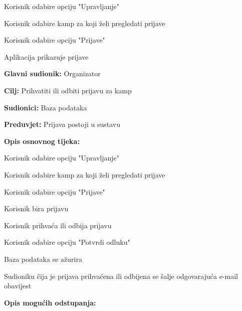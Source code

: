 \begin{packed_item}
\begin{packed_item}
						\item[] \begin{packed_enum}
							\item Korisnik odabire opciju "Upravljanje"
							\item Korisnik odabire kamp za koji želi pregledati prijave
							\item Korisnik odabire opciju "Prijave"
							\item Aplikacija prikazuje prijave 
						\end{packed_enum}								
					\end{packed_item}
				
					\noindent {}
					\begin{packed_item}
						
						\item \textbf{Glavni sudionik: } Organizator
						\item  \textbf{Cilj:} Prihvatiti ili odbiti prijavu za kamp
						\item  \textbf{Sudionici:} Baza podataka
						\item  \textbf{Preduvjet:} Prijava postoji u sustavu
						\item  \textbf{Opis osnovnog tijeka:}
						
						\item[] \begin{packed_enum}
							
							\item Korisnik odabire opciju "Upravljanje"
							\item Korisnik odabire kamp za koji želi pregledati prijave
							\item Korisnik odabire opciju "Prijave"
							\item Korisnik bira prijavu
							\item Korisnik prihvaća ili odbija prijavu
							\item Korisnik odabire opciju "Potvrdi odluku"
							\item Baza podataka se ažurira
							\item Sudioniku čija je prijava prihvaćena ili odbijena se šalje odgovarajuća e-mail obavijest
						\end{packed_enum}
						
						\item  \textbf{Opis mogućih odstupanja:}
						
						\item[] \begin{packed_item}
							

\end{packed_item}
\end{packed_item}
\end{packed_item}
